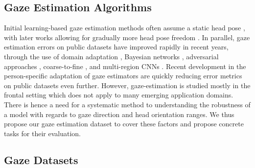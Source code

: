 \documentclass[runningheads]{llncs}
\begin{document}
\subsection{Gaze Estimation Algorithms}
Initial learning-based gaze estimation methods often assume a static head pose \cite{baluja1994non,lu2011inferring},
with later works allowing for gradually more head pose freedom \cite{lu2014adaptive,sugano2014learning}.
In parallel, gaze estimation errors on public datasets have improved rapidly in recent years, through the use of domain adaptation \cite{shrivastava2017learning}, Bayesian networks \cite{Wang_2018_CVPR}, adversarial approaches \cite{wang2019generalizing}, coarse-to-fine \cite{cheng2020coarse}, and multi-region CNNs \cite{krafka2016eye,fischer2018rt}.
Recent development in the person-specific adaptation of gaze estimators \cite{Park2019ICCV,yu2019improving,liu2018differential} are quickly reducing error metrics on public datasets even further. However, gaze-estimation is studied mostly in the frontal setting which does not apply to many emerging application domains.  
There is hence a need for a systematic method to understanding the robustness of a model with regards to gaze direction and head orientation ranges.
We thus propose our gaze estimation dataset to cover these factors and propose concrete tasks for their evaluation.


\subsection{Gaze Datasets}
\end{document}
